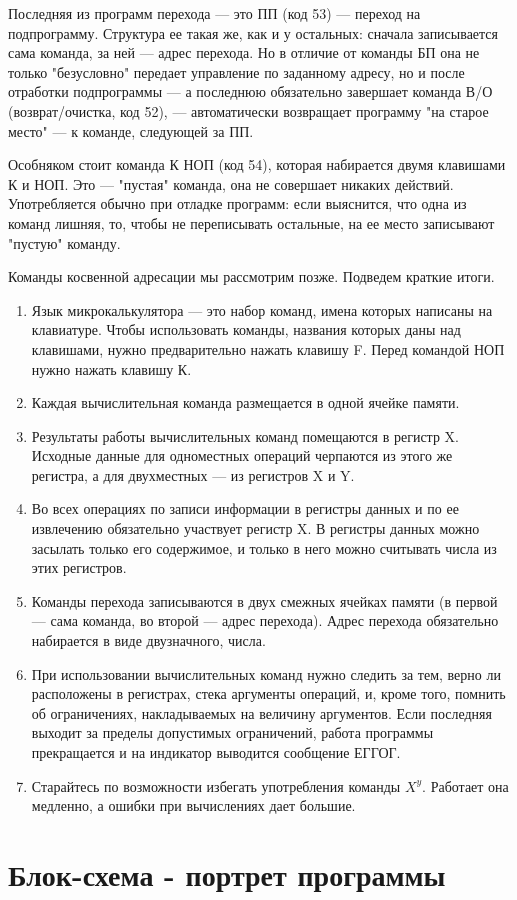 \documentclass[11pt,a4paper,oneside]{article}
\begin{document}
Последняя из программ перехода — это ПП (код 53) — переход на подпрограмму. Структура ее такая же, как и у остальных: сначала записывается сама команда, за ней — адрес перехода. Но в отличие от команды БП она не только "безусловно" передает управление по заданному адресу, но и после отработки подпрограммы — а последнюю обязательно завершает команда В/О (возврат/очистка, код 52), — автоматически возвращает программу "на старое место" — к команде, следующей за ПП.

Особняком стоит команда К НОП (код 54), которая набирается двумя клавишами К и НОП. Это — "пустая" команда, она не совершает никаких действий. Употребляется обычно при отладке программ: если выяснится, что одна из команд лишняя, то, чтобы не переписывать остальные, на ее место записывают "пустую" команду.

Команды косвенной адресации мы рассмотрим позже. Подведем краткие итоги.

\begin{enumerate}
\item Язык микрокалькулятора — это набор команд, имена которых написаны на клавиатуре. Чтобы использовать команды, названия которых даны над клавишами, нужно предварительно нажать клавишу F. Перед командой НОП нужно нажать клавишу К.
\item Каждая вычислительная команда размещается в одной ячейке памяти.
\item Результаты работы вычислительных команд помещаются в регистр X. Исходные данные для одноместных операций черпаются из этого же регистра, а для двухместных — из регистров X и Y.
\item Во всех операциях по записи информации в регистры данных и по ее извлечению обязательно участвует регистр X. В регистры данных можно засылать только его содержимое, и только в него можно считывать числа из этих регистров.
\item Команды перехода записываются в двух смежных ячейках памяти (в первой — сама команда, во второй — адрес перехода). Адрес перехода обязательно набирается в виде двузначного, числа.
\item При использовании вычислительных команд нужно следить за тем, верно ли расположены в регистрах, стека аргументы операций, и, кроме того, помнить об ограничениях, накладываемых на величину аргументов. Если последняя выходит за пределы допустимых ограничений, работа программы прекращается и на индикатор выводится сообщение ЕГГОГ.
\item Старайтесь по возможности избегать употребления команды $X^{y}$. Работает она медленно, а ошибки при вычислениях дает большие.
\end{enumerate}

\section{Блок-схема - портрет программы}
\end{document}
